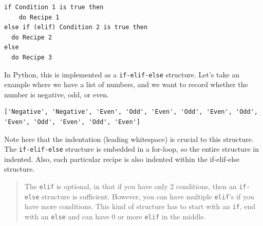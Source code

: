 \documentclass[
  letterpaper,
]{scrbook}
\newenvironment{Shaded}{\begin{snugshade}}{\end{snugshade}}
\newcommand{\BuiltInTok}[1]{#1}
\newcommand{\CommentTok}[1]{\textcolor[rgb]{0.56,0.35,0.01}{\textit{#1}}}
\newcommand{\ControlFlowTok}[1]{\textcolor[rgb]{0.13,0.29,0.53}{\textbf{#1}}}
\newcommand{\DecValTok}[1]{\textcolor[rgb]{0.00,0.00,0.81}{#1}}
\newcommand{\KeywordTok}[1]{\textcolor[rgb]{0.13,0.29,0.53}{\textbf{#1}}}
\newcommand{\NormalTok}[1]{#1}
\newcommand{\OperatorTok}[1]{\textcolor[rgb]{0.81,0.36,0.00}{\textbf{#1}}}
\newcommand{\StringTok}[1]{\textcolor[rgb]{0.31,0.60,0.02}{#1}}
\begin{document}
\begin{verbatim}
if Condition 1 is true then
	do Recipe 1
else if (elif) Condition 2 is true then
  do Recipe 2
else
  do Recipe 3
\end{verbatim}

In Python, this is implemented as a \texttt{if-elif-else} structure. Let's take an example where we have a list of numbers, and we want to record whether the number is negative, odd, or even.

\begin{Shaded}
\end{Shaded}

\begin{verbatim}
['Negative', 'Negative', 'Even', 'Odd', 'Even', 'Odd', 'Even', 'Odd', 'Even', 'Odd', 'Even', 'Odd', 'Even']
\end{verbatim}

Note here that the indentation (leading whitespace) is crucial to this structure. The \texttt{if-elif-else} structure is embedded in a for-loop, so the entire structure in indented. Also, each particular recipe is also indented within the if-elif-else structure.

\begin{quote}
The \texttt{elif} is optional, in that if you have only 2 conditions, then an \texttt{if-else} structure is sufficient. However, you can have multiple \texttt{elif}'s if you have more conditions. This kind of structure has to start with an \texttt{if}, end with an \texttt{else} and can have 0 or more \texttt{elif} in the middle.
\end{quote}
\end{document}
